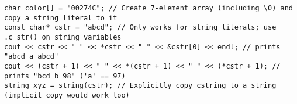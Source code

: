 \documentclass[7pt, twocolumn]{extarticle}
\begin{document}
\begin{small}
   \begin{tcolorbox}[top=-5pt,bottom=-5pt,left=-1pt,right=-1pt,boxrule=0.5pt,arc=0pt,center title,toptitle=-0.6mm,
  bottomtitle=-0.6mm,boxrule=0.5pt,arc=0pt,before skip = 3pt, after skip = 3pt,
  ]
              {
              \begin{lstlisting}[style = mystyle]
char color[] = "00274C"; // Create 7-element array (including \0) and copy a string literal to it
const char* cstr = "abcd"; // Only works for string literals; use .c_str() on string variables
cout << cstr << " " << *cstr << " " << &cstr[0] << endl; // prints "abcd a abcd" 
cout << (cstr + 1) << " " << *(cstr + 1) << " " << (*cstr + 1); // prints "bcd b 98" ('a' == 97)
string xyz = string(cstr); // Explicitly copy cstring to a string (implicit copy would work too)
\end{lstlisting}
}
   \end{tcolorbox}



\end{small}
\end{document}
